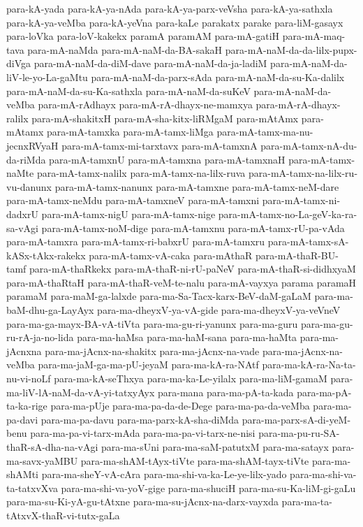{para-kA-yada
para-kA-ya-nAda
para-kA-ya-parx-veVsha
para-kA-ya-sathxla
para-kA-ya-veMba
para-kA-yeVna
para-kaLe
parakatx
parake
para-liM-gasayx
para-loVka
para-loV-kakekx
paramA
paramAM
para-mA-gatiH
para-mA-maq-tava
para-mA-naMda
para-mA-naM-da-BA-sakaH
para-mA-naM-da-da-lilx-pupx-diVga
para-mA-naM-da-diM-dave
para-mA-naM-da-ja-ladiM
para-mA-naM-da-liV-le-yo-La-gaMtu
para-mA-naM-da-parx-sAda
para-mA-naM-da-su-Ka-dalilx
para-mA-naM-da-su-Ka-sathxla
para-mA-naM-da-suKeV
para-mA-naM-da-veMba
para-mA-rAdhayx
para-mA-rA-dhayx-ne-mamxya
para-mA-rA-dhayx-ralilx
para-mA-shakitxH
para-mA-sha-kitx-liRMgaM
para-mAtAmx
para-mAtamx
para-mA-tamxka
para-mA-tamx-liMga
para-mA-tamx-ma-nu-jecnxRVyaH
para-mA-tamx-mi-tarxtavx
para-mA-tamxnA
para-mA-tamx-nA-du-da-riMda
para-mA-tamxnU
para-mA-tamxna
para-mA-tamxnaH
para-mA-tamx-naMte
para-mA-tamx-nalilx
para-mA-tamx-na-lilx-ruva
para-mA-tamx-na-lilx-ru-vu-danunx
para-mA-tamx-nanunx
para-mA-tamxne
para-mA-tamx-neM-dare
para-mA-tamx-neMdu
para-mA-tamxneV
para-mA-tamxni
para-mA-tamx-ni-dadxrU
para-mA-tamx-nigU
para-mA-tamx-nige
para-mA-tamx-no-La-geV-ka-ra-sa-vAgi
para-mA-tamx-noM-dige
para-mA-tamxnu
para-mA-tamx-rU-pa-vAda
para-mA-tamxra
para-mA-tamx-ri-babxrU
para-mA-tamxru
para-mA-tamx-sA-kASx-tAkx-rakekx
para-mA-tamx-vA-caka
para-mAthaR
para-mA-thaR-BU-tamf
para-mA-thaRkekx
para-mA-thaR-ni-rU-paNeV
para-mA-thaR-si-didhxyaM
para-mA-thaRtaH
para-mA-thaR-veM-te-nalu
para-mA-vayxya
parama
paramaH
paramaM
para-maM-ga-lalxde
para-ma-Sa-Tacx-karx-BeV-daM-gaLaM
para-ma-baM-dhu-ga-LayAyx
para-ma-dheyxV-ya-vA-gide
para-ma-dheyxV-ya-veVneV
para-ma-ga-mayx-BA-vA-tiVta
para-ma-gu-ri-yanunx
para-ma-guru
para-ma-gu-ru-rA-ja-no-lida
para-ma-haMsa
para-ma-haM-sana
para-ma-haMta
para-ma-jAcnxna
para-ma-jAcnx-na-shakitx
para-ma-jAcnx-na-vade
para-ma-jAcnx-na-veMba
para-ma-jaM-ga-ma-pU-jeyaM
para-ma-kA-ra-NAtf
para-ma-kA-ra-Na-ta-nu-vi-noLf
para-ma-kA-seThxya
para-ma-ka-Le-yilalx
para-ma-liM-gamaM
para-ma-liV-lA-naM-da-vA-yi-tatxyAyx
para-mana
para-ma-pA-ta-kada
para-ma-pA-ta-ka-rige
para-ma-pUje
para-ma-pa-da-de-Dege
para-ma-pa-da-veMba
para-ma-pa-davi
para-ma-pa-davu
para-ma-parx-kA-sha-diMda
para-ma-parx-sA-di-yeM-benu
para-ma-pa-vi-tarx-mAda
para-ma-pa-vi-tarx-ne-nisi
para-ma-pu-ru-SA-thaR-sA-dha-na-vAgi
para-ma-sUni
para-ma-saM-patutxM
para-ma-satayx
para-ma-savx-yaMBU
para-ma-shAM-tAyx-tiVte
para-ma-shAM-tayx-tiVte
para-ma-shAMti
para-ma-sheY-vA-cAra
para-ma-shi-va-ka-Le-ye-lilx-yado
para-ma-shi-va-ta-tatxvXva
para-ma-shi-va-yoV-gige
para-ma-shuciH
para-ma-su-Ka-liM-gi-gaLu
para-ma-su-Ki-yA-gu-tAtxne
para-ma-su-jAcnx-na-darx-vayxda
para-ma-ta-tAtxvX-thaR-vi-tutx-gaLa
}
